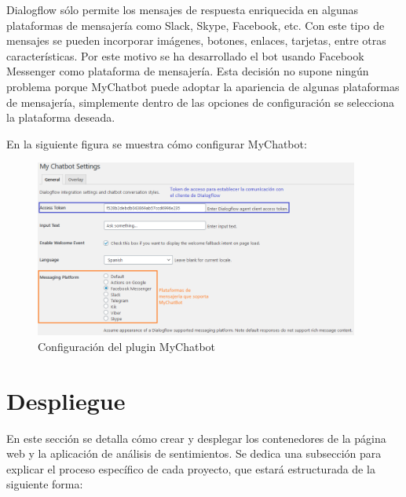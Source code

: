 Dialogflow sólo permite los mensajes de respuesta enriquecida en algunas plataformas de mensajería como Slack, Skype, Facebook, etc. Con este tipo de mensajes se pueden incorporar imágenes, botones, enlaces, tarjetas, entre otras características. Por este motivo se ha desarrollado el bot usando Facebook Messenger como plataforma de mensajería. Esta decisión no supone ningún problema porque MyChatbot puede adoptar la apariencia de algunas plataformas de mensajería, simplemente dentro de las opciones de configuración se selecciona la plataforma deseada. 

En la siguiente figura se muestra cómo configurar MyChatbot:

\begin{figure}[ht]
    	\begin{center}
    		\includegraphics[width = 0.95\textwidth]{Figuras/configuracionMychatbot.png}
    	\end{center}
    	\caption{\label{fig:mychatbotConfig} Configuración del plugin MyChatbot}
\end{figure}

\newpage

\section{Despliegue}

En este sección se detalla cómo crear y desplegar los contenedores de la página web y la aplicación de análisis de sentimientos. Se dedica una subsección para explicar el proceso específico de cada proyecto, que estará estructurada de la siguiente forma:

